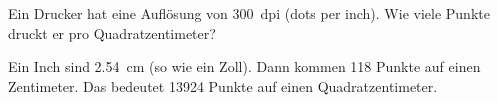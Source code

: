 
\begin{aufgabe}
	Ein Drucker hat eine Auflösung von \SI{300}{dpi} (dots per inch). 
	Wie viele Punkte druckt er pro Quadratzentimeter?
	\begin{loesung}
		Ein Inch sind \SI{2.54}{cm} (so wie ein Zoll). Dann kommen 118 Punkte auf einen Zentimeter.
		Das bedeutet \num{13924} Punkte auf einen Quadratzentimeter.
	\end{loesung}
\end{aufgabe}
